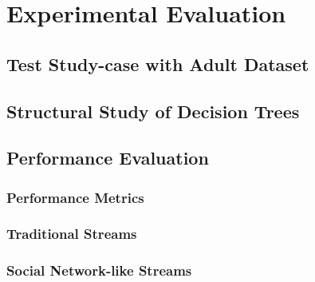 \chapter{Experimental Evaluation}
\label{chp:exp}



\section{Test Study-case with Adult Dataset}
\section{Structural Study of Decision Trees}
\section{Performance Evaluation}
\subsection{Performance Metrics}
\subsection{Traditional Streams}
\subsection{Social Network-like Streams}
